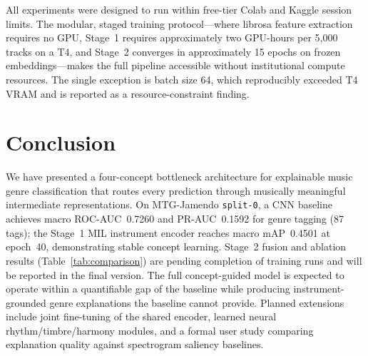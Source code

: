 \documentclass[sigconf,nonacm]{acmart}
\begin{document}
All experiments were designed to run within free-tier Colab and Kaggle session limits.
The modular, staged training protocol---where librosa feature extraction requires no GPU,
Stage~1 requires approximately two GPU-hours per 5,000 tracks on a T4, and Stage~2 converges
in approximately 15 epochs on frozen embeddings---makes the full pipeline accessible without
institutional compute resources. The single exception is batch size 64, which reproducibly
exceeded T4 VRAM and is reported as a resource-constraint finding.

\section{Conclusion}

We have presented a four-concept bottleneck architecture for explainable music genre
classification that routes every prediction through musically meaningful intermediate
representations. On MTG-Jamendo \texttt{split-0}, a CNN baseline achieves macro
ROC-AUC~0.7260 and PR-AUC~0.1592 for genre tagging (87 tags); the Stage~1 MIL instrument
encoder reaches macro mAP~0.4501 at epoch~40, demonstrating stable concept learning.
Stage~2 fusion and ablation results (Table~\ref{tab:comparison}) are pending completion of
training runs and will be reported in the final version. The full concept-guided model is
expected to operate within a quantifiable gap of the baseline while producing instrument-grounded
genre explanations the baseline cannot provide. Planned extensions include joint fine-tuning of
the shared encoder, learned neural rhythm/timbre/harmony modules, and a formal user study
comparing explanation quality against spectrogram saliency baselines.



\end{document}
